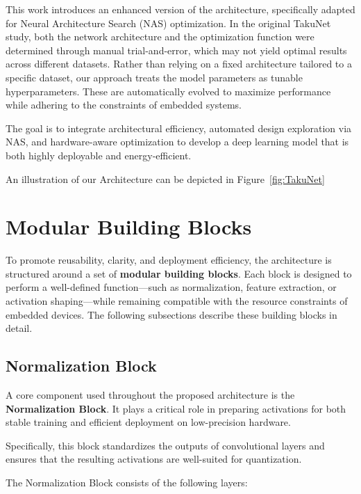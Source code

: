 This work introduces an enhanced version of the architecture, specifically adapted for Neural Architecture Search (NAS) optimization. In the original TakuNet study, both the network architecture and the optimization function were determined through manual trial-and-error, which may not yield optimal results across different datasets. Rather than relying on a fixed architecture tailored to a specific dataset, our approach treats the model parameters as tunable hyperparameters. These are automatically evolved to maximize performance while adhering to the constraints of embedded systems.

The goal is to integrate architectural efficiency, automated design exploration via NAS, and hardware-aware optimization to develop a deep learning model that is both highly deployable and energy-efficient.

An illustration of our Architecture can be depicted in Figure~\ref{fig:TakuNet}

\section{Modular Building Blocks}

To promote reusability, clarity, and deployment efficiency, the architecture is structured around a set of \textbf{modular building blocks}. Each block is designed to perform a well-defined function—such as normalization, feature extraction, or activation shaping—while remaining compatible with the resource constraints of embedded devices. The following subsections describe these building blocks in detail.


\subsection{Normalization Block}

\begin{sloppypar}
A core component used throughout the proposed architecture is the \textbf{Normalization Block}. It plays a critical role in preparing activations for both stable training and efficient deployment on low-precision hardware.
\end{sloppypar}

Specifically, this block standardizes the outputs of convolutional layers and ensures that the resulting activations are well-suited for quantization.


The Normalization Block consists of the following layers:

